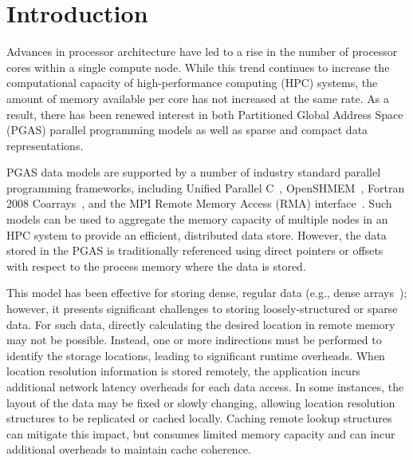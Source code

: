 \section{Introduction}

Advances in processor architecture have led to a rise in the number of
processor cores within a single compute node.  While this trend continues to
increase the computational capacity of high-performance computing (HPC)
systems, the amount of memory available per core has not increased at the same
rate.  As a result, there has been renewed interest in both Partitioned Global
Address Space (PGAS) parallel programming models as well as sparse and compact
data representations.

PGAS data models are supported by a number of industry standard parallel
programming frameworks, including Unified Parallel C~\cite{upc-13-spec},
OpenSHMEM~\cite{openshmem-1.3}, Fortran 2008 Coarrays~\cite{reid:08}, and the MPI
Remote Memory Access (RMA) interface~\cite{mpi-forum:15}.  Such models can be used
to aggregate the memory capacity of multiple nodes in an HPC system to provide
an efficient, distributed data store.  However, the data stored in the PGAS is
traditionally referenced using direct pointers or offsets with respect to the
process memory where the data is stored.

This model has been effective for storing dense, regular data (e.g.,
dense arrays~\cite{ga}); however, it presents significant challenges
to storing loosely-structured or sparse data.  For such data, directly
calculating the desired location in remote memory may not be possible.
Instead, one or more indirections must be performed to identify the
storage locations, leading to significant runtime overheads.  When
location resolution information is stored remotely, the application
incurs additional network latency overheads for each data access. In
some instances, the layout of the data may be fixed or slowly
changing, allowing location resolution structures to be replicated or
cached locally. Caching remote lookup structures can mitigate this
impact, but consumes limited memory capacity and can incur additional
overheads to maintain cache coherence.


